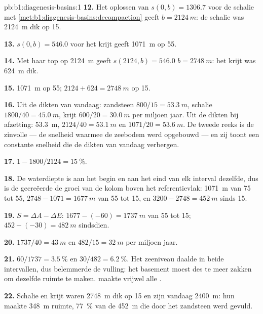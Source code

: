 \begin{solution}{pb:b1:diagenesis-basins:1}
\textbf{12.} Het oplossen van $s(0, b) = 1306.7$ voor de schalie met
\cref{met:b1:diagenesis-basins:decompaction} geeft $b = \qty{2124}{m}$: de schalie
was \qty{2124}{m} dik op \qty{15}{\Ma}.

\textbf{13.} $s(0, b) = 546.0$ voor het krijt geeft \qty{1071}{m} op
\qty{55}{\Ma}.

\textbf{14.} Met haar top op \qty{2124}{m} geeft $s(2124, b) = 546.0$ $b =
\qty{2748}{m}$: het krijt was \qty{624}{m} dik.

\textbf{15.} \qty{1071}{m} op \qty{55}{\Ma}; $2124 + 624 = \qty{2748}{m}$ op
\qty{15}{\Ma}.

\textbf{16.} Uit de dikten van vandaag: zandsteen $800/15 = \qty{53.3}{m}$,
schalie $1800/40 = \qty{45.0}{m}$, krijt $600/20 = \qty{30.0}{m}$ per miljoen
jaar. Uit de dikten bij afzetting: \qty{53.3}{m}, $2124/40 =
\qty{53.1}{m}$ en $1071/20 = \qty{53.6}{m}$. De tweede reeks is de zinvolle
--- de snelheid waarmee de zeebodem werd opgebouwd --- en zij toont een constante
snelheid die de dikten van vandaag verbergen.

\textbf{17.} $1 - 1800/2124 = \qty{15}{\%}$.

\textbf{18.} De waterdiepte is aan het begin en aan het eind van elk interval dezelfde, dus is de
gecreëerde  de groei van de kolom boven het referentievlak: \qty{1071}{m} van 75 tot
\qty{55}{\Ma}, $2748 - 1071 = \qty{1677}{m}$ van 55 tot \qty{15}{\Ma}, en $3200 - 2748 = \qty{452}{m}$
sinds \qty{15}{\Ma}.

\textbf{19.} $S = \Delta A - \Delta E$: $1677 - (-60) = \qty{1737}{m}$ van 55 tot
\qty{15}{\Ma}; $452 - (-30) = \qty{482}{m}$ sindsdien.

\textbf{20.} $1737/40 = \qty{43}{m}$ en $482/15 = \qty{32}{m}$ per miljoen jaar.

\textbf{21.} $60/1737 = \qty{3.5}{\%}$ en $30/482 = \qty{6.2}{\%}$. Het zeeniveau daalde in beide intervallen,
dus belemmerde  de vulling: het basement moest des te meer zakken om dezelfde ruimte te maken.
 maakte vrijwel alle .

\textbf{22.} Schalie en krijt waren \qty{2748}{m} dik op \qty{15}{\Ma} en zijn vandaag \qty{2400}{m}:
hun  maakte \qty{348}{m} ruimte, \qty{77}{\%} van de \qty{452}{m} die door het zandsteen werd gevuld.


\end{solution}
